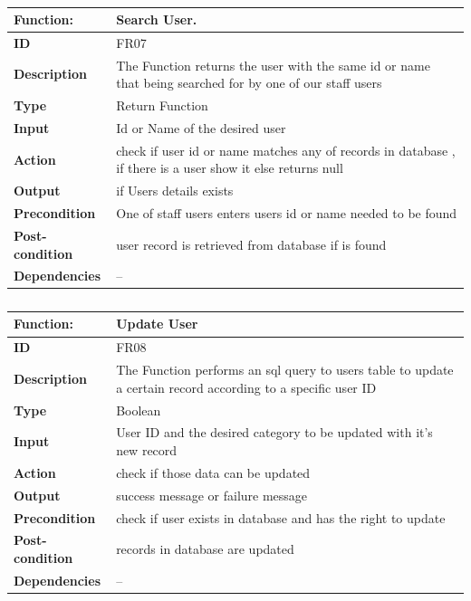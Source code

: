 \documentclass[]{article}
\begin{document}
\FloatBarrier
\begin{table}[h]
\caption{}
\label{tab:my-table}
\begin{tabular}{|p{}|p{}|}
\hline
\textbf{Function:} & Search User.
\\ \hline
\textbf{ID}  & FR07           
\\ \hline
\textbf{Description} & The Function returns the user with the same id or name that being searched for by one of our staff users                                              
\\ \hline
\textbf{Type}  & Return Function        

\\ \hline
\textbf{Input}  & Id or Name of the desired user 

\\ \hline
\textbf{Action} & check if user id or name matches any of records in database , if there is a user show it else returns null
\\ \hline
\textbf{Output} & if Users details exists
\\ \hline
\textbf{Precondition}   &   One of staff users enters users id or name needed to be found
\\ \hline
\textbf{Post-condition} & user record is retrieved from database if is found 
\\ \hline
\textbf{Dependencies} & -- 
\\ \hline
\end{tabular}
\end{table}

\FloatBarrier
\begin{table}[h]
\caption{}
\label{tab:my-table}
\begin{tabular}{|p{}|p{}|}
\hline
\textbf{Function:} & Update User
\\ \hline
\textbf{ID}  &  FR08          
\\ \hline
\textbf{Description} & The Function performs an sql query to users table to update a certain record according to a specific user ID                                                     
\\ \hline
\textbf{Type}    &  Boolean       

\\ \hline
\textbf{Input}  & User ID and the desired category to be updated with it's new record  
\\ \hline
\textbf{Action} & check if those data can be updated 
\\ \hline
\textbf{Output}  & success message or failure message  
\\ \hline
\textbf{Precondition}  &  check if user exists in database and has the right to update 

\\ \hline
\textbf{Post-condition} & records in database are updated  
\\ \hline
\textbf{Dependencies}    & -- 
\\ \hline
\end{tabular}
\end{table}
\end{document}
